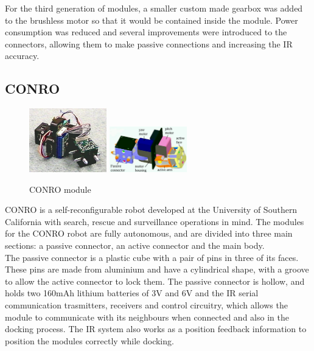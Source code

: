 For the third generation of modules, a smaller custom made gearbox was added to the brushless motor so that it would be contained inside the module. Power consumption was reduced and several improvements were introduced to the connectors, allowing them to make passive connections and increasing the IR accuracy.
\\


\subsection{CONRO}
\label{state_modules_CONRO}

\begin{figure}[b]
	\centering
	\includegraphics[width=0.3\textwidth]{images/CONRO01.jpg}
	\includegraphics[width=0.3\textwidth]{images/CONRO02.jpg}
	\caption{CONRO module}\label{fig:conro}
\end{figure}
CONRO\cite{castano_conro_2002} is a self-reconfigurable robot developed at the University of Southern California with search, rescue and surveillance operations in mind. The modules for the CONRO robot are fully autonomous, and are divided into three main sections: a passive connector, an active connector and the main body. 
\\

The passive connector is a plastic cube with a pair of pins in three of its faces. These pins are made from aluminium and have a cylindrical shape, with a groove to allow the active connector to lock them. The passive connector is hollow, and holds two 160mAh lithium batteries of 3V and 6V and the IR serial communication trasmitters, receivers and control circuitry, which allows the module to communicate with its neighbours when connected and also in the docking process. The IR system also works as a position feedback information to position the modules correctly while docking.
\\

